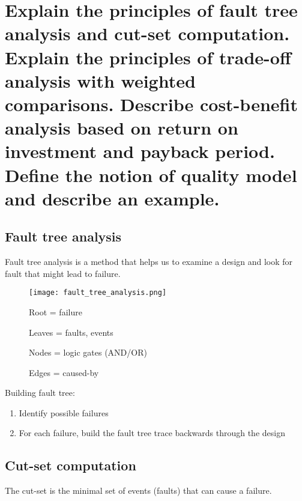 \clearpage{}
\section{Explain the principles of fault tree analysis and cut-set
computation. Explain the principles of trade-off analysis with weighted
comparisons. Describe cost-benefit analysis based on return on
investment and payback period. Define the notion of quality model and
describe an example.}

\subsection{Fault tree analysis}

Fault tree analysis is a method that helps us to examine a design and
look for fault that might lead to failure.

\begin{figure}[!ht]
    \centering
    \begin{minipage}{\linewidth}
        \begin{minipage}{0.45\linewidth}
            \centering
            \texttt{[image: fault\_tree\_analysis.png]}
        \end{minipage}
        \begin{minipage}{0.45\linewidth}
            Root = failure

            Leaves = faults, events

            Nodes = logic gates (AND/OR)

            Edges = caused-by
        \end{minipage}
    \end{minipage}
\end{figure}

Building fault tree:
\begin{enumerate}
    \item Identify possible failures
    \item For each failure, build the fault tree trace backwards through the design
\end{enumerate}

\subsection{Cut-set computation}

The cut-set is the minimal set of events (faults) that can cause a failure. 

